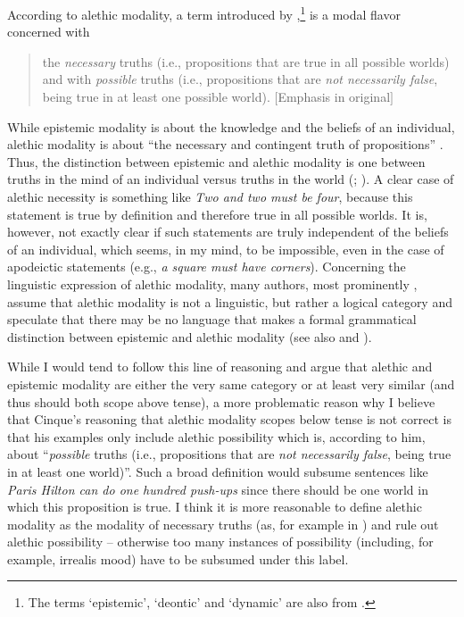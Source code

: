 According to \citet[78]{cinque1999adverbs} alethic modality, a term introduced by \citet{von1951essay},\footnote{ The terms `epistemic', `deontic' and `dynamic' are also from \citet{von1951essay}.} is a modal flavor concerned with

\begin{quote}
the \textit{necessary} truths (i.e., propositions that are true in all possible worlds) and with \textit{possible} truths (i.e., propositions that are \textit{not necessarily false}, being true in at least one possible world). $[$Emphasis in original$]$ %
\end{quote}

\noindent While epistemic modality is about the knowledge and the beliefs of an individual, alethic modality is about ``the necessary and contingent truth of propositions'' \citep[8--9]{nuyts2006modality}. Thus, the distinction between epistemic and alethic modality is one between truths in the mind of an individual versus truths in the world (\citealt[11]{palmer1986mood}; \citealt[9]{nuyts2006modality}). A clear case of alethic necessity is something like \textit{Two and two must be four}, because this statement is true by definition and therefore true in all possible worlds. It is, however, not exactly clear if such statements are truly independent of the beliefs of an individual, which seems, in my mind, to be impossible, even in the case of apodeictic statements (e.g., \textit{a square must have corners}). Concerning the linguistic expression of alethic modality, many authors, most prominently \citet[11]{palmer1986mood}, assume that alethic modality is not a linguistic, but rather a logical category and speculate that there may be no language that makes a formal grammatical distinction between epistemic and alethic modality (see also \citealt[28]{nuyts2000epistemic} and \citealt{von2006modality}).

While I would tend to follow this line of reasoning and argue that alethic and epistemic modality are either the very same category or at least very similar (and thus should both scope above tense), a more problematic reason why I believe that Cinque's reasoning that alethic modality scopes below tense is not correct is that his examples only include alethic possibility which is, according to him, about ``\textit{possible} truths (i.e., propositions that are \textit{not necessarily false}, being true in at least one world)''. Such a broad definition would subsume sentences like \textit{Paris Hilton can do one hundred push-ups} since there should be one world in which this proposition is true. I think it is more reasonable to define alethic modality as the modality of necessary truths (as, for example in \citealt{nuyts2000epistemic}) and rule out alethic possibility -- otherwise too many instances of possibility (including, for example, irrealis mood) have to be subsumed under this label. 


